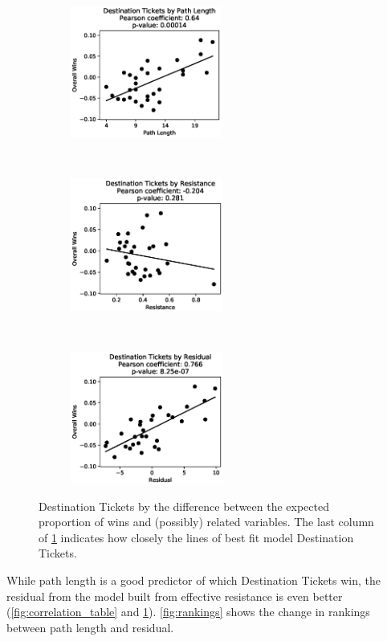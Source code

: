 \begin{figure}[H]
    \centering
    \begin{subfigure}[t]{0.36\textwidth}
        \centering
        \includegraphics[height=1.7in]{figures/correlation0}
    \end{subfigure}%
    ~ 
    \begin{subfigure}[t]{0.36\textwidth}
        \centering
        \includegraphics[height=1.7in]{figures/correlation1}
    \end{subfigure}%
    ~ 
    \begin{subfigure}[t]{0.36\textwidth}
        \centering
        \includegraphics[height=1.7in]{figures/correlation2}
    \end{subfigure}%
    \caption{Destination Tickets by the
    difference between the expected proportion of wins
    and (possibly) related variables.
    The last column of \cref{fig:correlation_figures}
    indicates how closely the lines of best fit
    model Destination Tickets.}
    \label{fig:correlation_figures}
\end{figure}

While path length is a good predictor 
of which Destination Tickets win, 
the residual from the model built from effective resistance
is even better (\cref{fig:correlation_table} and
\cref{fig:correlation_figures}).
\cref{fig:rankings} shows the change in rankings
between path length and residual.


